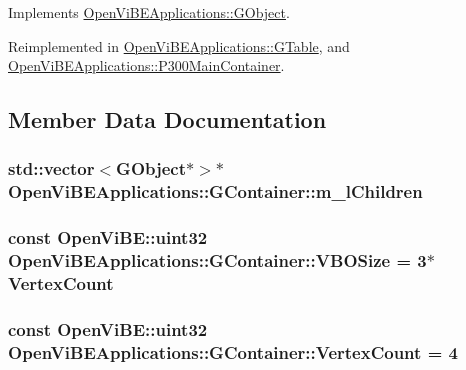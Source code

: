Implements \hyperlink{classOpenViBEApplications_1_1GObject_a4b50dbc5c1db8346461892dcdd53db86}{OpenViBEApplications::GObject}.



Reimplemented in \hyperlink{classOpenViBEApplications_1_1GTable_aa622d2eec95a252e6f50dff7e62907f3}{OpenViBEApplications::GTable}, and \hyperlink{classOpenViBEApplications_1_1P300MainContainer_adc9a6d35ed5a3e7939837561ddc2ebad}{OpenViBEApplications::P300MainContainer}.



\subsection{Member Data Documentation}
\hypertarget{classOpenViBEApplications_1_1GContainer_a17dac34cda13e1ab45a7b88b3f3e19f9}{
\subsubsection[{m\_\-lChildren}]{\setlength{\rightskip}{0pt plus 5cm}std::vector$<${\bf GObject}$\ast$$>$$\ast$ {\bf OpenViBEApplications::GContainer::m\_\-lChildren}}}
\label{classOpenViBEApplications_1_1GContainer_a17dac34cda13e1ab45a7b88b3f3e19f9}
\hypertarget{classOpenViBEApplications_1_1GContainer_a86ba0dc62cf6c379af8cef58b3972d93}{
\subsubsection[{VBOSize}]{\setlength{\rightskip}{0pt plus 5cm}const OpenViBE::uint32 {\bf OpenViBEApplications::GContainer::VBOSize} = 3$\ast${\bf VertexCount}}}
\label{classOpenViBEApplications_1_1GContainer_a86ba0dc62cf6c379af8cef58b3972d93}
\hypertarget{classOpenViBEApplications_1_1GContainer_aa19161724939d76588a0fcb19761e6f1}{
\subsubsection[{VertexCount}]{\setlength{\rightskip}{0pt plus 5cm}const OpenViBE::uint32 {\bf OpenViBEApplications::GContainer::VertexCount} = 4}}
\label{classOpenViBEApplications_1_1GContainer_aa19161724939d76588a0fcb19761e6f1}


